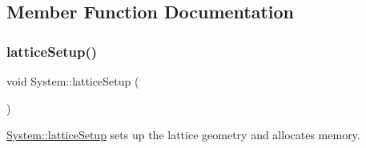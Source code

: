 \subsection{Member Function Documentation}
\mbox{\label{class_system_a93c8a8258ac8f6382ec393bca1271011}} 
\subsubsection{\texorpdfstring{latticeSetup()}{latticeSetup()}}
{\footnotesize\ttfamily void System\+::lattice\+Setup (\begin{DoxyParamCaption}{ }\end{DoxyParamCaption})}



\mbox{\hyperlink{class_system_a93c8a8258ac8f6382ec393bca1271011}{System\+::lattice\+Setup}} sets up the lattice geometry and allocates memory. 

